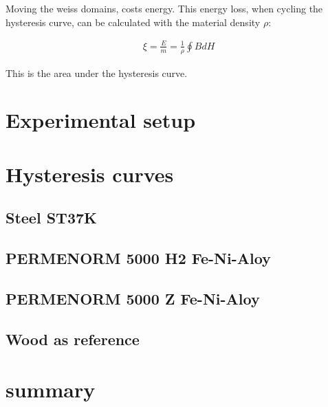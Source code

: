 \documentclass[a4paper,10pt,twocolumn]{article}
\begin{document}
    Moving the weiss domains, costs energy.
    This energy loss, when cycling the hysteresis curve, can be calculated with the material density $\rho$:
    
    \begin{align}
        \label{eq:EnergyLoss}
        \xi = \frac{E}{m} = \frac{1}{\rho} \oint{B dH}
    \end{align}
    
    This is the area under the hysteresis curve.
    
    \section{Experimental setup}
    
    \section{Hysteresis curves}
    \subsection{Steel ST37K}
    \label{subsec:steel}
    \subsection{PERMENORM 5000 H2 Fe-Ni-Aloy}
    \subsection{PERMENORM 5000 Z Fe-Ni-Aloy}
    \subsection{Wood as reference}
    \section{summary}
    
    
    \begin{thebibliography}{}    %
        
    \end{thebibliography}
    
\end{document}

